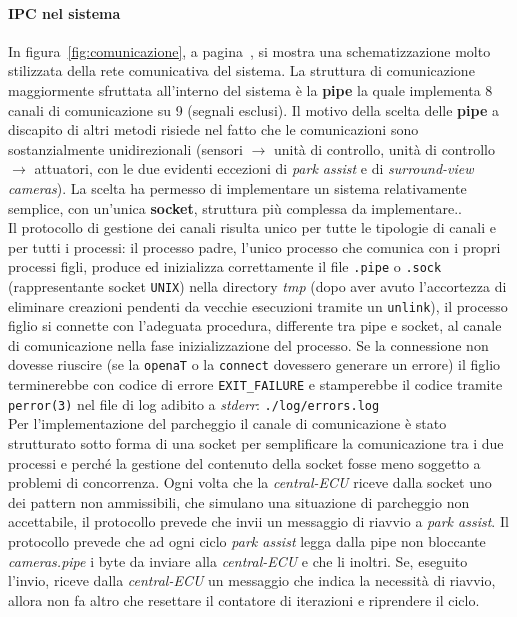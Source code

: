 \documentclass[11pt, openany]{article}
\theoremstyle{definition}
\theoremstyle{plain}
\theoremstyle{remark}
\begin{document}
		\paragraph{IPC nel sistema}
			In figura~\ref{fig:comunicazione}, a pagina~\pageref{fig:comunicazione}, si mostra una schematizzazione molto stilizzata della rete comunicativa del sistema.
			La struttura di comunicazione maggiormente sfruttata all'interno del sistema è la \textbf{pipe} la quale implementa 8 canali di comunicazione su 9 (segnali esclusi). Il motivo della scelta delle \textbf{pipe} a discapito di altri metodi risiede nel fatto che le comunicazioni sono sostanzialmente unidirezionali (sensori $\rightarrow$ unità di controllo, unità di controllo $\rightarrow$ attuatori, con le due evidenti eccezioni di \textit{park assist} e di \textit{surround-view cameras}). La scelta ha permesso di implementare un sistema relativamente semplice, con un'unica \textbf{socket}, struttura più complessa da implementare..\\
			Il protocollo di gestione dei canali risulta unico per tutte le tipologie di canali e per tutti i processi: il processo padre, l'unico processo che comunica con i propri processi figli, produce ed inizializza correttamente il file \texttt{.pipe} o \texttt{.sock} (rappresentante socket \texttt{UNIX}) nella directory \textit{tmp} (dopo aver avuto l'accortezza di eliminare creazioni pendenti da vecchie esecuzioni tramite un \texttt{unlink}), il processo figlio si connette con  l'adeguata procedura, differente tra pipe e socket, al canale di comunicazione nella fase inizializzazione del processo. Se la connessione non dovesse riuscire (se la \texttt{openaT} o la \texttt{connect} dovessero generare un errore) il figlio terminerebbe con codice di errore \texttt{EXIT\_FAILURE} e stamperebbe il codice tramite \texttt{perror(3)} nel file di log adibito a \textit{stderr}: \texttt{./log/errors.log}\\
			Per l'implementazione del parcheggio il canale di comunicazione è stato strutturato sotto forma di una socket per semplificare la comunicazione tra i due processi e perché la gestione del contenuto della socket fosse meno soggetto a problemi di concorrenza. Ogni volta che la \textit{central-ECU} riceve dalla socket uno dei pattern non ammissibili, che simulano una situazione di parcheggio non accettabile, il protocollo prevede che invii un messaggio di riavvio a \textit{park assist}. Il protocollo prevede che ad ogni ciclo \textit{park assist} legga dalla pipe non bloccante \textit{cameras.pipe} i byte da inviare alla \textit{central-ECU} e che li inoltri. Se, eseguito l'invio, riceve dalla \textit{central-ECU} un messaggio che indica la necessità di riavvio, allora non fa altro che resettare il contatore di iterazioni e riprendere il ciclo.
\end{document}
